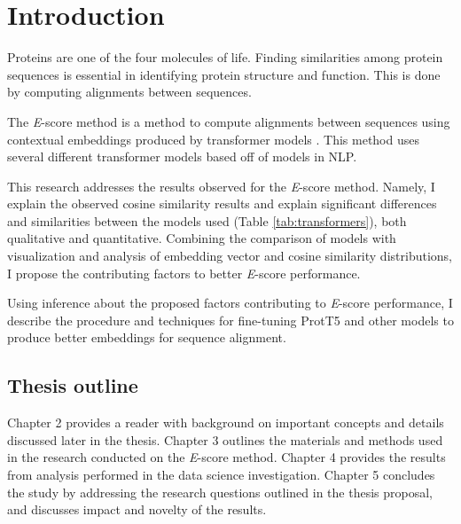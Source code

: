 \chapter{Introduction}

Proteins are one of the four molecules of life. Finding similarities among protein sequences is essential in identifying protein structure and function. This is done by computing alignments between sequences.

The \textit{E}-score method is a method to compute alignments between sequences using contextual embeddings produced by \gls{transformer} models \cite{Ashrafzadeh:2023}. This method uses several different transformer models based off of models in \gls{NLP}.

This research addresses the results observed for the \textit{E}-score method. Namely, I explain the observed cosine similarity results and explain significant differences and similarities between the models used (Table \ref{tab:transformers}), both qualitative and quantitative. Combining the comparison of models with visualization and analysis of embedding vector and cosine similarity distributions, I propose the contributing factors to better \textit{E}-score performance.

Using inference about the proposed factors contributing to \textit{E}-score performance, I describe the procedure and techniques for fine-tuning ProtT5 and other models to produce better embeddings for sequence alignment.

\section{Thesis outline}
Chapter 2 provides a reader with background on important concepts and details discussed later in the thesis. Chapter 3 outlines the materials and methods used in the research conducted on the \textit{E}-score method. Chapter 4 provides the results from analysis performed in the data science investigation. Chapter 5 concludes the study by addressing the research questions outlined in the thesis proposal, and discusses impact and novelty of the results.